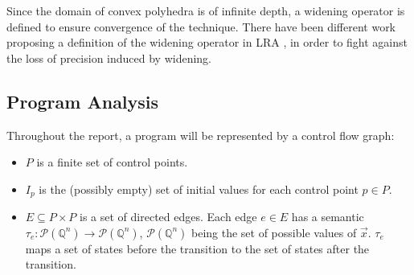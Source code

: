 \documentclass[a4paper,english,titlepage,11pt]{article}
\def\Q{\mathbb{Q}}
\def\P{\mathcal{P}}
\begin{document}
Since the domain of convex polyhedra is of infinite depth, a widening operator
is defined to ensure convergence of the technique. There have been different
work proposing a definition of the widening operator in LRA
\cite{CH78,Hal79,HPR97,BlanchetCousotEtAl_PLDI03}, in order to fight
against the loss of precision induced by widening.

\subsection{Program Analysis}

Throughout the report, a program will be represented by a control flow graph:
\begin{itemize}
\item $P$ is a finite set of control points.
\item $I_p$ is the (possibly empty)
set of initial values for each control point $p \in P$.
\item $E \subseteq  P \times P$ is a set of directed edges. Each edge $e \in E$
has a semantic $\tau_e: \P(\Q^n) \rightarrow \P(\Q^n)$, $\P(\Q^n)$ being the set
of possible values of $\overrightarrow{x}$. $\tau_e$ maps a set of states before
the transition to the set of states after the transition.
\end{itemize}
\end{document}
